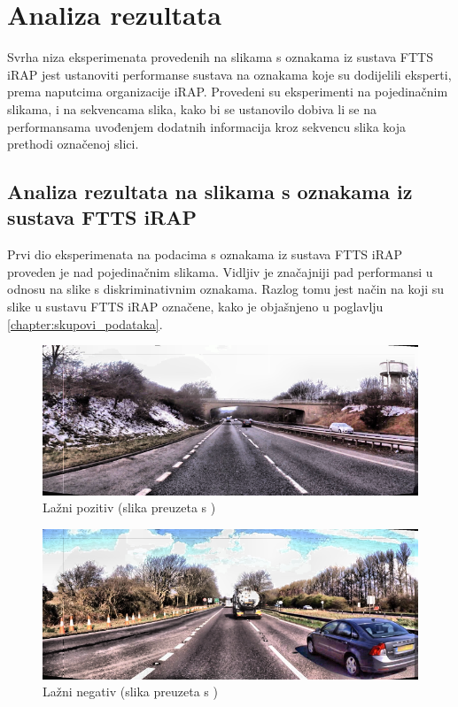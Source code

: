 \documentclass[times, utf8, diplomski, numeric]{fer}
\begin{document}
\section{Analiza rezultata}
Svrha niza eksperimenata provedenih na slikama s oznakama iz sustava FTTS iRAP jest ustanoviti performanse sustava na oznakama koje su dodijelili eksperti, prema naputcima organizacije iRAP.
Provedeni su eksperimenti na pojedinačnim slikama, i na sekvencama slika, kako bi se ustanovilo dobiva li se na performansama uvođenjem dodatnih informacija kroz sekvencu slika koja prethodi označenoj slici.

\subsection{Analiza rezultata na slikama s oznakama iz sustava FTTS iRAP}
Prvi dio eksperimenata na podacima s oznakama iz sustava FTTS iRAP proveden je nad pojedinačnim slikama. 
Vidljiv je značajniji pad performansi u odnosu na slike s diskriminativnim oznakama. 
Razlog tomu jest način na koji su slike u sustavu FTTS iRAP označene, kako je objašnjeno u poglavlju \ref{chapter:skupovi_podataka}.

\begin{figure}[H]
\centering
\includegraphics[scale=0.55]{images/single_irap_false_positive.png}
\caption{Lažni pozitiv (slika preuzeta s \citep{url:ftts_irap})}
\label{img:single_irap_false_positive}
\end{figure}

\begin{figure}[H]
\centering
\includegraphics[scale=0.55]{images/single_irap_false_negative.png}
\caption{Lažni negativ (slika preuzeta s \citep{url:ftts_irap})}
\label{img:single_irap_false_negative}
\end{figure}
\end{document}
